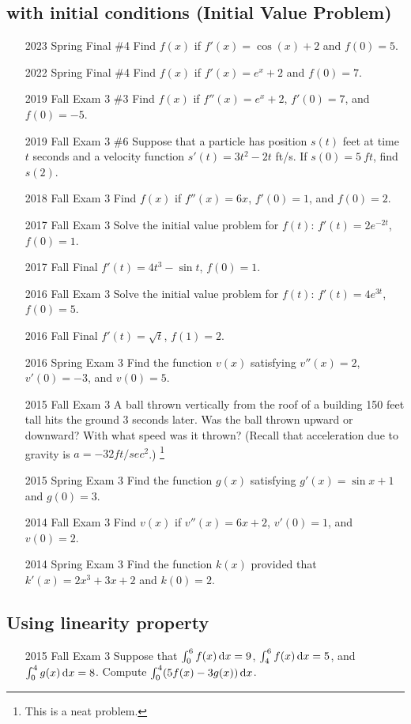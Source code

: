\documentclass[10pt]{scrartcl}
\theoremstyle{definition}
\begin{document}
\subsection{with initial conditions (Initial Value Problem)}
\begin{enumerate}
\item [2023 Spring Final \#4] Find $f(x)$ if $f'(x) = \cos(x) + 2$ and $f(0) = 5$.
\item [2022 Spring Final \#4] Find $f(x)$ if $f'(x) = e^x+2$ and $f(0) = 7$.
\item [2019 Fall Exam 3 \#3] Find $f(x)$ if $f''(x) = e^x+2$, $f'(0) = 7$, and $f(0) = -5$.
\item [2019 Fall Exam 3 \#6] Suppose that a particle has position $s(t)$ feet at time $t$ seconds and a velocity function $s'(t) = 3t^2 - 2t$ ft/s. If $s(0) = 5\ \unit{ft}$, find $s(2)$.
\item [2018 Fall Exam 3] Find $f(x)$ if $f''(x) = 6x$, $f'(0) = 1$, and $f(0) = 2$.
\item [2017 Fall Exam 3] Solve the initial value problem for $f(t)$: $f'(t) = 2e^{-2t}$, $f(0) = 1$.
\item [2017 Fall Final] $f'(t) = 4t^3 - \sin t$, $f(0) = 1$.
\item [2016 Fall Exam 3] Solve the initial value problem for $f(t)$: $f'(t) = 4e^{3t}$, $f(0) = 5$.
\item [2016 Fall Final] $f'(t) = \sqrt{t}$, $f(1) = 2$.
\item [2016 Spring Exam 3] Find the function $v(x)$ satisfying $v''(x) = 2$, $v'(0) = -3$, and $v(0) = 5$.
\item [2015 Fall Exam 3] A ball thrown vertically from the roof of a building 150 feet tall hits the ground 3 seconds later. Was the ball thrown upward or downward? With what speed was it thrown? (Recall that acceleration due to gravity is $a = -32 \si{ft/sec^2}$.) \footnote{This is a neat problem.}
\item [2015 Spring Exam 3] Find the function $g(x)$ satisfying $g'(x) = \sin x + 1$ and $g(0) = 3$.
\item [2014 Fall Exam 3] Find $v(x)$ if $v''(x) = 6x+ 2$, $v'(0) = 1$, and $v(0) = 2$.
\item [2014 Spring Exam 3] Find the function $k(x)$ provided that $k'(x) = 2x^3 + 3x + 2$ and $k(0) = 2$.
\end{enumerate}

\subsection{Using linearity property}
\begin{enumerate}
\item [2015 Fall Exam 3] Suppose that $\int_0^6 f(x) \dif x = 9$, $\int_4^6 f(x) \dif x = 5$, and $\int_0^4 g(x) \dif x = 8$. Compute $\int_0^4 (5f(x) - 3g(x)) \dif x$.
\end{enumerate}
\end{document}
